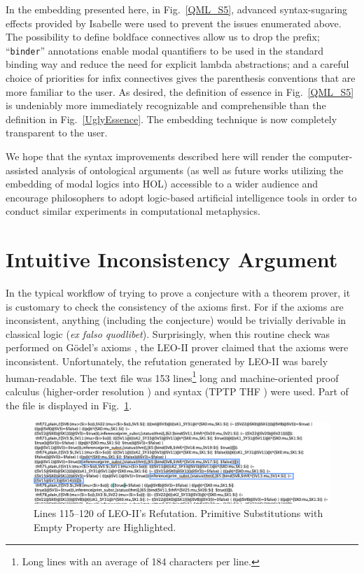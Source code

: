 \documentclass{article}
\begin{document}
In the embedding presented here, in Fig.~\ref{QML_S5}, advanced syntax-sugaring effects provided by Isabelle were used to prevent the issues enumerated above. The possibility to define boldface connectives allow us to drop the prefix; ``\texttt{binder}'' annotations enable modal quantifiers to be used in the standard binding way and reduce the need for explicit lambda abstractions; and a careful choice of priorities for infix connectives gives the parenthesis conventions that are more familiar to the user. As desired, the definition of essence in Fig.~\ref{QML_S5} is undeniably more immediately recognizable and comprehensible than the definition in Fig.~\ref{UglyEssence}. The embedding technique is now completely transparent to the user.

We hope that the syntax improvements described here will render the computer-assisted analysis of ontological arguments (as well as future works utilizing the embedding of modal logics into HOL) accessible to a wider audience and encourage philosophers to adopt logic-based artificial intelligence tools in order to conduct similar experiments in computational metaphysics.


\section{Intuitive Inconsistency Argument}

In the typical workflow of trying to prove a conjecture with a theorem prover, it is customary to check the consistency of the axioms first. For if the axioms are inconsistent, anything (including the conjecture) would be trivially derivable in classical logic (\emph{ex falso quodlibet}). Surprisingly, when this routine check was performed on G\"odel's axioms \cite{C40}, the LEO-II prover claimed that the axioms were inconsistent. Unfortunately, the refutation generated by LEO-II was barely human-readable. The text file was 153 lines\footnote{Long lines with an average of 184 characters per line.} long and machine-oriented proof calculus (higher-order resolution \cite{}) and syntax (TPTP THF \cite{}) were used. Part of the file is displayed in Fig.~\ref{LEO-Proof}.

\begin{figure}
\centerline{\includegraphics[width=\textwidth]{./Images/LEO-Proof.png}}
\caption{Lines 115--120 of LEO-II's Refutation. Primitive Substitutions with Empty Property are Highlighted.} \label{LEO-Proof}
\end{figure}
\end{document}
